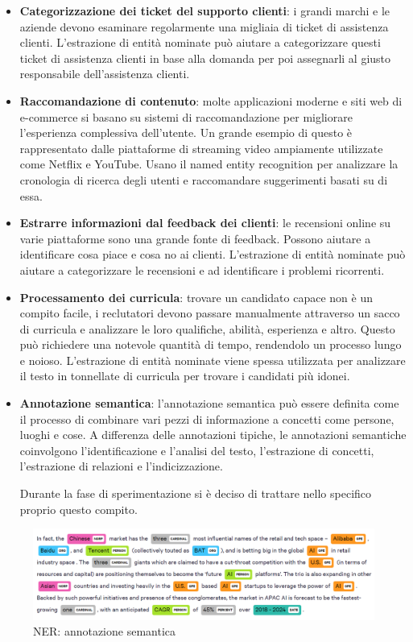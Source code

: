 \begin{itemize}
    \item \textbf{Categorizzazione dei ticket del supporto clienti}: i grandi marchi e le aziende devono esaminare regolarmente una migliaia di ticket di assistenza clienti. L'estrazione di entità nominate può aiutare a categorizzare questi ticket di assistenza clienti in base alla domanda per poi assegnarli al giusto responsabile dell'assistenza clienti. 
    \item \textbf{Raccomandazione di contenuto}: molte applicazioni moderne e siti web di e-commerce si basano su sistemi di raccomandazione per migliorare l'esperienza complessiva dell'utente. Un grande esempio di questo è rappresentato dalle piattaforme di streaming video ampiamente utilizzate come Netflix e YouTube. Usano il named entity recognition per analizzare la cronologia di ricerca degli utenti e raccomandare suggerimenti basati su di essa. 
    \item \textbf{Estrarre informazioni dal feedback dei clienti}: le recensioni online su varie piattaforme sono una grande fonte di feedback. Possono aiutare a identificare cosa piace e cosa no ai clienti. L'estrazione di entità nominate può aiutare a categorizzare le recensioni e ad identificare i problemi ricorrenti.
    \item \textbf{Processamento dei curricula}: trovare un candidato capace non è un compito facile, i reclutatori devono passare manualmente attraverso un sacco di curricula e analizzare le loro qualifiche, abilità, esperienza e altro. Questo può richiedere una notevole quantità di tempo, rendendolo un processo lungo e noioso. L'estrazione di entità nominate viene spessa utilizzata per analizzare il testo in tonnellate di curricula per trovare i candidati più idonei.
    \item \textbf{Annotazione semantica}: l'annotazione semantica può essere definita come il processo di combinare vari pezzi di informazione a concetti come persone, luoghi e cose. A differenza delle annotazioni tipiche, le annotazioni semantiche coinvolgono l'identificazione e l'analisi del testo, l'estrazione di concetti, l'estrazione di relazioni e l'indicizzazione. 
    
    Durante la fase di sperimentazione si è deciso di trattare nello specifico proprio questo compito.
\end{itemize}

\begin{figure}[hbt!]
    \centering
    \includegraphics[width=1\textwidth]{img/ner_example.png}
    \caption{NER: annotazione semantica}
    \label{fig:ner_example}
\end{figure}